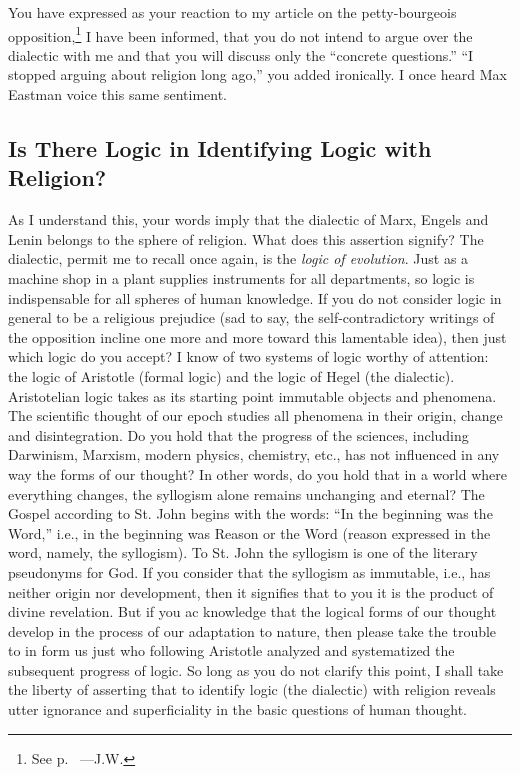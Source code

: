 

You have expressed as your reaction to my article on the petty-bourgeois opposition,\footnote{See p.~\pageref{1939-12-15_a-petty-bourgeois-opposition-in-the-socialist-workers-party} ---J.W.} I have been informed, that you do not intend to argue over the dialectic with me and that you will discuss only the “concrete questions.” “I stopped arguing about religion long ago,” you added ironically. I once heard Max Eastman voice this same sentiment.

\subsection*{Is There Logic in Identifying Logic with Religion?}

As I understand this, your words imply that the dialectic of Marx, Engels and Lenin belongs to the sphere of religion. What does this assertion signify? The dialectic, permit me to recall once again, is the \emph{logic of evolution}. Just as a machine shop in a plant supplies instruments for all departments, so logic is indispensable for all spheres of human knowledge. If you do not consider logic in general to be a religious prejudice (sad to say, the self-contradictory writings of the opposition incline one more and more toward this lamentable idea), then just which logic do you accept? I know of two systems of logic worthy of attention: the logic of Aristotle (formal logic) and the logic of Hegel (the dialectic). Aristotelian logic takes as its starting point immutable objects and phenomena. The scientific thought of our epoch studies all phenomena in their origin, change and disintegration. Do you hold that the progress of the sciences, including Darwinism, Marxism, modern physics, chemistry, etc., has not influenced in any way the forms of our thought? In other words, do you hold that in a world where everything changes, the syllogism alone remains unchanging and eternal? The Gospel according to St. John begins with the words: “In the beginning was the Word,” i.e., in the beginning was Reason or the Word (reason expressed in the word, namely, the syllogism). To St. John the syllogism is one of the literary pseudonyms for God. If you consider that the syllogism as immutable, i.e., has neither origin nor development, then it signifies that to you it is the product of divine revelation. But if you ac knowledge that the logical forms of our thought develop in the process of our adaptation to nature, then please take the trouble to in form us just who following Aristotle analyzed and systematized the subsequent progress of logic. So long as you do not clarify this point, I shall take the liberty of asserting that to identify logic (the dialectic) with religion reveals utter ignorance and superficiality in the basic questions of human thought.

